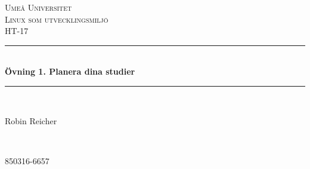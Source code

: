\documentclass[11pt]{article}
\begin{document}

\begin{titlepage} %
	\newcommand{\HRule}{\rule{\linewidth}{0.5mm}} %
	
	\center %
	
	
	\textsc{\LARGE Umeå Universitet}\\[1.5cm] %
	
	\textsc{\Large Linux som utvecklingsmiljö}\\[0.5cm] %
	
	\textsc{\large HT-17}\\[0.5cm] %
	
	
	\HRule\\[0.4cm]
	
	{\huge\bfseries Övning 1. Planera dina studier}\\[0.4cm] %
	
	\HRule\\[1.5cm]
	
	
	\begin{minipage}{0.4\textwidth}
		\begin{flushleft}
			\large
			Robin Reicher
		\end{flushleft}
	\end{minipage}
	~
	\begin{minipage}{0.4\textwidth}
		\begin{flushright}
			\large
			850316-6657
		\end{flushright}
	\end{minipage}
	
	

\end{titlepage}
\end{document}

